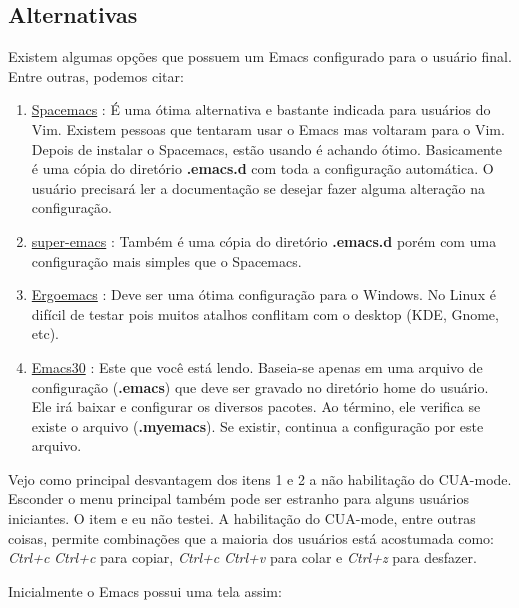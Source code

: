 \documentclass[]{article}
\providecommand{\tightlist}{%
  \setlength{\itemsep}{0pt}\setlength{\parskip}{0pt}}
\begin{document}
\subsection{Alternativas}\label{alternativas}

Existem algumas opções que possuem um Emacs configurado para o usuário
final. Entre outras, podemos citar:

\begin{enumerate}
\tightlist
\item
  \href{https://github.com/syl20bnr/spacemacs}{Spacemacs} : É uma ótima
  alternativa e bastante indicada para usuários do Vim. Existem pessoas
  que tentaram usar o Emacs mas voltaram para o Vim. Depois de instalar
  o Spacemacs, estão usando é achando ótimo. Basicamente é uma cópia do
  diretório \textbf{.emacs.d} com toda a configuração automática. O
  usuário precisará ler a documentação se desejar fazer alguma alteração
  na configuração.
\item
  \href{https://github.com/myTerminal/super-emacs}{super-emacs} : Também
  é uma cópia do diretório \textbf{.emacs.d} porém com uma configuração
  mais simples que o Spacemacs.
\item
  \href{https://github.com/ergoemacs/ergoemacs-mode}{Ergoemacs} : Deve
  ser uma ótima configuração para o Windows. No Linux é difícil de
  testar pois muitos atalhos conflitam com o desktop (KDE, Gnome, etc).
\item
  \href{https://github.com/guaracy/emacs/tree/master/config}{Emacs30} :
  Este que você está lendo. Baseia-se apenas em uma arquivo de
  configuração (\textbf{.emacs}) que deve ser gravado no diretório home
  do usuário. Ele irá baixar e configurar os diversos pacotes. Ao
  término, ele verifica se existe o arquivo (\textbf{.myemacs}). Se
  existir, continua a configuração por este arquivo.
\end{enumerate}

Vejo como principal desvantagem dos itens 1 e 2 a não habilitação do
CUA-mode. Esconder o menu principal também pode ser estranho para alguns
usuários iniciantes. O item e eu não testei. A habilitação do CUA-mode,
entre outras coisas, permite combinações que a maioria dos usuários está
acostumada como: \emph{Ctrl+c} \emph{Ctrl+c} para copiar, \emph{Ctrl+c}
\emph{Ctrl+v} para colar e \emph{Ctrl+z} para desfazer.

Inicialmente o Emacs possui uma tela assim:
\end{document}
